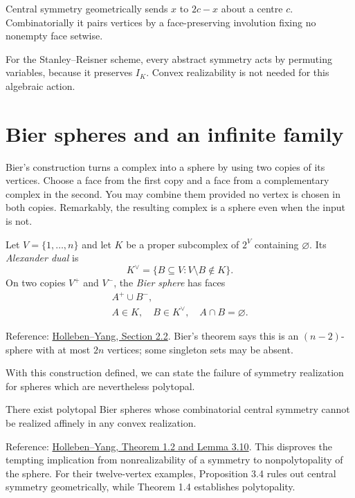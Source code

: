 Central symmetry geometrically sends
$x$ to $2c-x$ about a centre $c$.
Combinatorially it pairs vertices by a
face-preserving involution fixing no
nonempty face setwise.

For the Stanley--Reisner scheme,
every abstract symmetry acts by permuting
variables, because it preserves $I_K$.
Convex realizability is not needed for
this algebraic action.

\section{Bier spheres and an infinite
family}
\label{subsection-bier-spheres}

\noindent
Bier's construction turns a complex into
a sphere by using two copies of its
vertices. Choose a face from the first
copy and a face from a complementary
complex in the second. You may combine
them provided no vertex is chosen in both
copies. Remarkably, the resulting complex
is a sphere even when the input is not.

\begin{definition}
\label{definition-bier-sphere}
Let $V=\{1,\ldots,n\}$ and let $K$ be a
proper subcomplex of $2^V$ containing
$\varnothing$. Its \emph{Alexander dual}
is
$$
K^\vee=\{B\subseteq V:V\setminus B\notin K\}.
$$
On two copies $V^+$ and $V^-$, the
\emph{Bier sphere} has faces
$$
\begin{gathered}
A^+\cup B^-,\\
A\in K,\quad B\in K^\vee,\quad
A\cap B=\varnothing.
\end{gathered}
$$
\end{definition}

\noindent
Reference:
\href{https://arxiv.org/abs/2608.07233}
{Holleben--Yang, Section 2.2}.
Bier's theorem says this is an
$(n-2)$-sphere with at most $2n$ vertices;
some singleton sets may be absent.

With this construction defined, we can
state the failure of symmetry realization
for spheres which are nevertheless
polytopal.

\begin{theorem}
\label{theorem-polytopal-nonrealizable}
There exist polytopal Bier spheres whose
combinatorial central symmetry cannot be
realized affinely in any convex
realization.
\end{theorem}

\noindent
Reference:
\href{https://arxiv.org/abs/2608.07233}
{Holleben--Yang, Theorem 1.2 and
Lemma 3.10}.
This disproves the tempting implication
from nonrealizability of a symmetry to
nonpolytopality of the sphere.
For their twelve-vertex examples,
Proposition 3.4 rules out central
symmetry geometrically, while Theorem 1.4
establishes polytopality.

